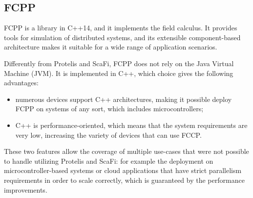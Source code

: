 \subsection{FCPP}\label{subsection:fcpp}
FCPP \cite{fcpp_introduction} is a library in C++14, and it implements the field calculus.\newline
It provides tools for simulation of distributed systems, and its extensible component-based architecture makes it suitable for a wide range of application scenarios.

Differently from Protelis and ScaFi, FCPP does not rely on the Java Virtual Machine (JVM). It is implemented in C++, which choice gives the following advantages:
\begin{itemize}
    \item numerous devices support C++ architectures, making it possible deploy FCPP on systems of any sort, which includes microcontrollers;
    \item C++ is performance-oriented, which means that the system requirements are very low, increasing the variety of devices that can use FCCP.
\end{itemize}

These two features allow the coverage of multiple use-cases that were not possible to handle utilizing Protelis and ScaFi: for example the deployment on microcontroller-based systems or cloud applications that have strict parallelism requirements in order to scale correctly, which is guaranteed by the performance improvements.

